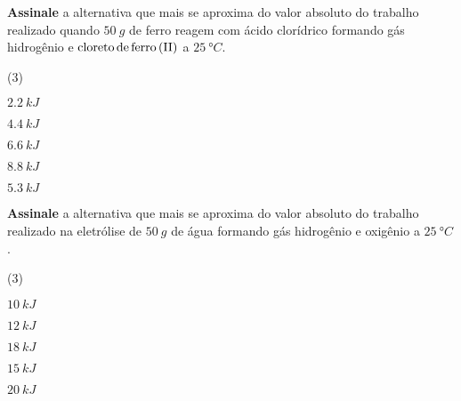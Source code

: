 \documentclass[braun, twocolumn]{braun}
\begin{document}
\begin{problem}
[2A03]\textbf{Assinale} a alternativa que mais se aproxima do valor absoluto
do trabalho realizado quando \(\qty{50}{g}\) de ferro reagem com ácido
clorídrico formando gás hidrogênio e \(\ce{cloreto de ferro (II)}\) a
\(\qty{25}{\degree C}\).


\begin{choices}
(3)
\item \(\qty{2,2}{kJ}\)

\item \(\qty{4,4}{kJ}\)

\item \(\qty{6,6}{kJ}\)

\item \(\qty{8,8}{kJ}\)

\item \(\qty{5,3}{kJ}\)

\end{choices}

\end{problem}



\begin{problem}
[2A04]\textbf{Assinale} a alternativa que mais se aproxima do valor absoluto
do trabalho realizado na eletrólise de \(\qty{50}{g}\) de água formando
gás hidrogênio e oxigênio a \(\qty{25}{\degree C}\).


\begin{choices}
(3)
\item \(\qty{10}{kJ}\)

\item \(\qty{12}{kJ}\)

\item \(\qty{18}{kJ}\)

\item \(\qty{15}{kJ}\)

\item \(\qty{20}{kJ}\)

\end{choices}

\end{problem}
\end{document}
